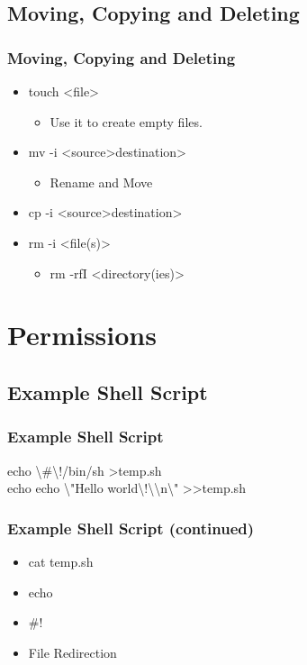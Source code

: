 \documentclass[hyperref={pdfpagelabels=false}]{beamer}
\begin{document}
\subsection{Moving, Copying and Deleting}
\frame
{
    \frametitle{Moving, Copying and Deleting}
    \begin{itemize}
    \item{touch} {\textless}file\textgreater\hspace{.5 pc}
        \begin{itemize}
        \item{Use it to create empty files.}
        \end{itemize}
    \item{mv -i {\textless}source\textgreater\hspace{.5 pc}{\textless}destination\textgreater\hspace{.5 pc}}
	\begin{itemize}
        \item{Rename and Move}
        \end{itemize}
    \item{cp -i {\textless}source\textgreater\hspace{.5 pc}{\textless}destination\textgreater\hspace{.5 pc}}
    \item{rm -i {\textless}file(s)\textgreater\hspace{.5 pc}}
	\begin{itemize}
        \item{rm -rfI {\textless}directory(ies)\textgreater\hspace{.5 pc}}
        \end{itemize}
    \end{itemize}
}
\section{Permissions}
\subsection{Example Shell Script}
\frame
{
    \frametitle{Example Shell Script}
    echo \textbackslash\#\textbackslash!/bin/sh \textgreater \hspace{.5 pc}temp.sh\\
    echo echo \textbackslash"Hello world\textbackslash!\textbackslash{\textbackslash}n\textbackslash" \textgreater\textgreater \hspace{.5 pc}temp.sh
}
\frame
{
    \frametitle{Example Shell Script (continued)}
    \begin{itemize}
    \item{cat temp.sh}
    \item{echo}
    \item{\#!}
    \item{File Redirection}
    \end{itemize}
}
\end{document}

